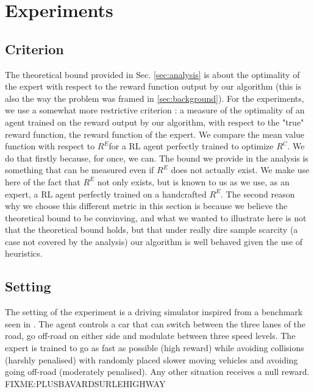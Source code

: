 \documentclass[11pt]{article}
\begin{document}
\section{Experiments}
\label{sec:experiments}
\subsection{Criterion}
The theoretical bound provided in Sec. \ref{sec:analysis} is about the optimality of the expert with respect to the reward function output by our algorithm (this is also the way the problem was framed in \ref{sec:background}). For the experiments, we use a somewhat more restrictive criterion : a measure of the optimality of an agent trained on the reward output by our algorithm, with respect to the "true" reward function, the reward function of the expert. We compare the mean value function with respect to $R^E$for a RL agent perfectly trained to optimize $R^C$. We do that firstly because, for once, we can. The bound we provide in the analysis is something that can be measured even if $R^E$ does not actually exist. We make use here of the fact that $R^E$ not only exists, but is known to us as we use, as an expert, a RL agent perfectly trained on a handcrafted $R^E$. The second reason why we choose this different metric in this section is because we believe the theoretical bound to be convinving, and what we wanted to illustrate here is not that the theoretical bound holds, but that under really dire sample scarcity (a case not covered by the analysis) our algorithm is well behaved given the use of heuristics.
\subsection{Setting}
The setting of the experiment is a driving simulator inspired from a benchmark seen in \cite{syed2008apprenticeship,syed2008game}. The agent controls a car that can switch between the three lanes of the road, go off-road on either side and modulate between three speed levels. The expert is trained to go as fast as possible (high reward) while avoiding collisions (harshly penalised) with randomly placed slower moving vehicles and avoiding going off-road (moderately penalised). Any other situation receives a null reward.  FIXME:PLUSBAVARDSURLEHIGHWAY
\end{document}

